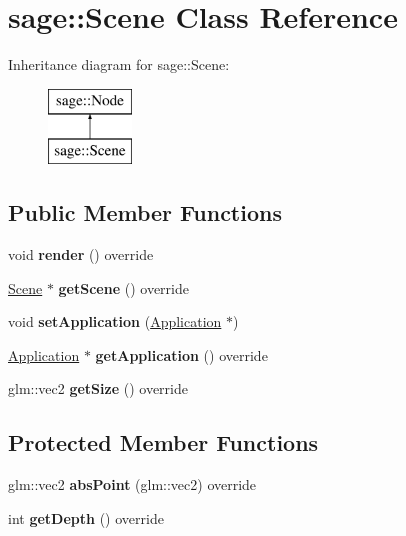 \hypertarget{classsage_1_1Scene}{}\section{sage\+::Scene Class Reference}
\label{classsage_1_1Scene}
Inheritance diagram for sage\+::Scene\+:\begin{figure}[H]
\begin{center}
\leavevmode
\includegraphics[height=2.000000cm]{classsage_1_1Scene}
\end{center}
\end{figure}
\subsection*{Public Member Functions}
\begin{DoxyCompactItemize}
\item 
\mbox{\label{classsage_1_1Scene_a5179bf540ba57931b65668b5b42af10f}} 
void {\bfseries render} () override
\item 
\mbox{\label{classsage_1_1Scene_ab09415b375ad054825e9fd4d4e471c6b}} 
\mbox{\hyperlink{classsage_1_1Scene}{Scene}} $\ast$ {\bfseries get\+Scene} () override
\item 
\mbox{\label{classsage_1_1Scene_a9c1362c9cef9cd8029f912d4003908c8}} 
void {\bfseries set\+Application} (\mbox{\hyperlink{classsage_1_1Application}{Application}} $\ast$)
\item 
\mbox{\label{classsage_1_1Scene_a30ecf9ad001d30773982f0808b05867d}} 
\mbox{\hyperlink{classsage_1_1Application}{Application}} $\ast$ {\bfseries get\+Application} () override
\item 
\mbox{\label{classsage_1_1Scene_a00e53fc54466062ecc1437b980f5fa69}} 
glm\+::vec2 {\bfseries get\+Size} () override
\end{DoxyCompactItemize}
\subsection*{Protected Member Functions}
\begin{DoxyCompactItemize}
\item 
\mbox{\label{classsage_1_1Scene_a97d7d623cc44062249a199c63c67b5be}} 
glm\+::vec2 {\bfseries abs\+Point} (glm\+::vec2) override
\item 
\mbox{\label{classsage_1_1Scene_a46335ecefda27ab0b907397a393a12f9}} 
int {\bfseries get\+Depth} () override
\end{DoxyCompactItemize}
